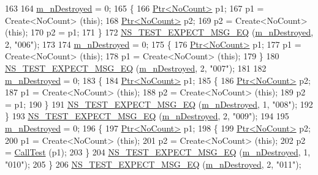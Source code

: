 \begin{DoxyCode}
163 
164   \hyperlink{classPtrTestCase_a189fef4a0d0e348de7554be35da17977}{m\_nDestroyed} = 0;
165   \{
166     \hyperlink{classns3_1_1Ptr}{Ptr<NoCount>} p1;
167     p1 = Create<NoCount> (\textcolor{keyword}{this});
168     \hyperlink{classns3_1_1Ptr}{Ptr<NoCount>} p2;
169     p2 = Create<NoCount> (\textcolor{keyword}{this});
170     p2 = p1;
171   \}
172   \hyperlink{group__testing_ga7304ba46a28d8cf08dfdfd6499cf7068}{NS\_TEST\_EXPECT\_MSG\_EQ} (\hyperlink{classPtrTestCase_a189fef4a0d0e348de7554be35da17977}{m\_nDestroyed}, 2, \textcolor{stringliteral}{"006"});
173 
174   \hyperlink{classPtrTestCase_a189fef4a0d0e348de7554be35da17977}{m\_nDestroyed} = 0;
175   \{
176     \hyperlink{classns3_1_1Ptr}{Ptr<NoCount>} p1;
177     p1 = Create<NoCount> (\textcolor{keyword}{this});
178     p1 = Create<NoCount> (\textcolor{keyword}{this});
179   \}
180   \hyperlink{group__testing_ga7304ba46a28d8cf08dfdfd6499cf7068}{NS\_TEST\_EXPECT\_MSG\_EQ} (\hyperlink{classPtrTestCase_a189fef4a0d0e348de7554be35da17977}{m\_nDestroyed}, 2, \textcolor{stringliteral}{"007"});
181 
182   \hyperlink{classPtrTestCase_a189fef4a0d0e348de7554be35da17977}{m\_nDestroyed} = 0;
183   \{
184     \hyperlink{classns3_1_1Ptr}{Ptr<NoCount>} p1;
185     \{
186       \hyperlink{classns3_1_1Ptr}{Ptr<NoCount>} p2;
187       p1 = Create<NoCount> (\textcolor{keyword}{this});
188       p2 = Create<NoCount> (\textcolor{keyword}{this});
189       p2 = p1;
190     \}
191     \hyperlink{group__testing_ga7304ba46a28d8cf08dfdfd6499cf7068}{NS\_TEST\_EXPECT\_MSG\_EQ} (\hyperlink{classPtrTestCase_a189fef4a0d0e348de7554be35da17977}{m\_nDestroyed}, 1, \textcolor{stringliteral}{"008"});
192   \}
193   \hyperlink{group__testing_ga7304ba46a28d8cf08dfdfd6499cf7068}{NS\_TEST\_EXPECT\_MSG\_EQ} (\hyperlink{classPtrTestCase_a189fef4a0d0e348de7554be35da17977}{m\_nDestroyed}, 2, \textcolor{stringliteral}{"009"});
194 
195   \hyperlink{classPtrTestCase_a189fef4a0d0e348de7554be35da17977}{m\_nDestroyed} = 0;
196   \{
197     \hyperlink{classns3_1_1Ptr}{Ptr<NoCount>} p1;
198     \{
199       \hyperlink{classns3_1_1Ptr}{Ptr<NoCount>} p2;
200       p1 = Create<NoCount> (\textcolor{keyword}{this});
201       p2 = Create<NoCount> (\textcolor{keyword}{this});
202       p2 = \hyperlink{classPtrTestCase_a5a8f1774dc4f729c4db20ce128fb3e66}{CallTest} (p1);
203     \}
204     \hyperlink{group__testing_ga7304ba46a28d8cf08dfdfd6499cf7068}{NS\_TEST\_EXPECT\_MSG\_EQ} (\hyperlink{classPtrTestCase_a189fef4a0d0e348de7554be35da17977}{m\_nDestroyed}, 1, \textcolor{stringliteral}{"010"});
205   \}
206   \hyperlink{group__testing_ga7304ba46a28d8cf08dfdfd6499cf7068}{NS\_TEST\_EXPECT\_MSG\_EQ} (\hyperlink{classPtrTestCase_a189fef4a0d0e348de7554be35da17977}{m\_nDestroyed}, 2, \textcolor{stringliteral}{"011"});

\end{DoxyCode}

